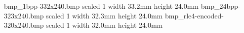 \XeTeXpicfile bmp_1bpp-332x240.bmp scaled 1 width 33.2mm height 24.0mm
\XeTeXpicfile bmp_24bpp-323x240.bmp scaled 1 width 32.3mm height 24.0mm
\XeTeXpicfile bmp_rle4-encoded-320x240.bmp scaled 1 width 32.0mm height 24.0mm
\bye
